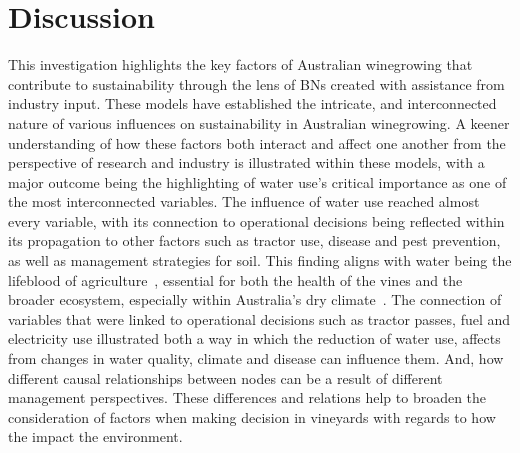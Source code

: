 \documentclass[fleqn,10pt]{wlscirep}
\begin{document}







\section{Discussion}
This investigation highlights the key factors of Australian winegrowing that contribute to sustainability through the lens of BNs created with assistance from industry input. These models have established the intricate, and interconnected nature of various influences on sustainability in Australian winegrowing. A keener understanding of how these factors both interact and affect one another from the perspective of research and industry is illustrated within these models, with a major outcome being the highlighting of water use's critical importance as one of the most interconnected variables. The influence of water use reached almost every variable, with its connection to operational decisions being reflected within its propagation to other factors such as tractor use, disease and pest prevention, as well as management strategies for soil. This finding aligns with water being the lifeblood of agriculture~, essential for both the health of the vines and the broader ecosystem, especially within Australia's dry climate~. The connection of variables that were linked to operational decisions such as tractor passes, fuel and electricity use illustrated both a way in which the reduction of water use, affects from changes in water quality, climate and disease can influence them. And, how different causal relationships between nodes can be a result of different management perspectives. These differences and relations help to broaden the consideration of factors when making decision in vineyards with regards to how the impact the environment.
\end{document}
